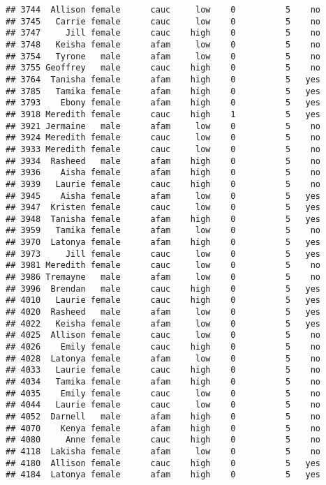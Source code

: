 \documentclass[
]{article}
\begin{document}
\begin{verbatim}
## 3744  Allison female      cauc     low    0          5    no
## 3745   Carrie female      cauc     low    0          5    no
## 3747     Jill female      cauc    high    0          5    no
## 3748   Keisha female      afam     low    0          5    no
## 3754   Tyrone   male      afam     low    0          5    no
## 3755 Geoffrey   male      cauc    high    0          5    no
## 3764  Tanisha female      afam    high    0          5   yes
## 3785   Tamika female      afam    high    0          5   yes
## 3793    Ebony female      afam    high    0          5   yes
## 3918 Meredith female      cauc    high    1          5   yes
## 3921 Jermaine   male      afam     low    0          5    no
## 3924 Meredith female      cauc     low    0          5    no
## 3933 Meredith female      cauc     low    0          5    no
## 3934  Rasheed   male      afam    high    0          5    no
## 3936    Aisha female      afam    high    0          5    no
## 3939   Laurie female      cauc    high    0          5    no
## 3945    Aisha female      afam     low    0          5   yes
## 3947  Kristen female      cauc     low    0          5   yes
## 3948  Tanisha female      afam    high    0          5   yes
## 3959   Tamika female      afam     low    0          5    no
## 3970  Latonya female      afam    high    0          5   yes
## 3973     Jill female      cauc     low    0          5   yes
## 3981 Meredith female      cauc     low    0          5    no
## 3986 Tremayne   male      afam     low    0          5    no
## 3996  Brendan   male      cauc    high    0          5   yes
## 4010   Laurie female      cauc    high    0          5   yes
## 4020  Rasheed   male      afam     low    0          5   yes
## 4022   Keisha female      afam     low    0          5   yes
## 4025  Allison female      cauc     low    0          5    no
## 4026    Emily female      cauc    high    0          5    no
## 4028  Latonya female      afam     low    0          5    no
## 4033   Laurie female      cauc    high    0          5    no
## 4034   Tamika female      afam    high    0          5    no
## 4035    Emily female      cauc     low    0          5    no
## 4044   Laurie female      cauc     low    0          5    no
## 4052  Darnell   male      afam    high    0          5    no
## 4070    Kenya female      afam    high    0          5    no
## 4080     Anne female      cauc    high    0          5    no
## 4118  Lakisha female      afam     low    0          5    no
## 4180  Allison female      cauc    high    0          5   yes
## 4184  Latonya female      afam    high    0          5   yes

\end{verbatim}
\end{document}

